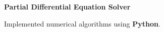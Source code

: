 \textbf{Partial Differential Equation Solver}

	\begin{items}
		\item Implemented numerical algorithms using \textbf{Python}.
	\end{items}